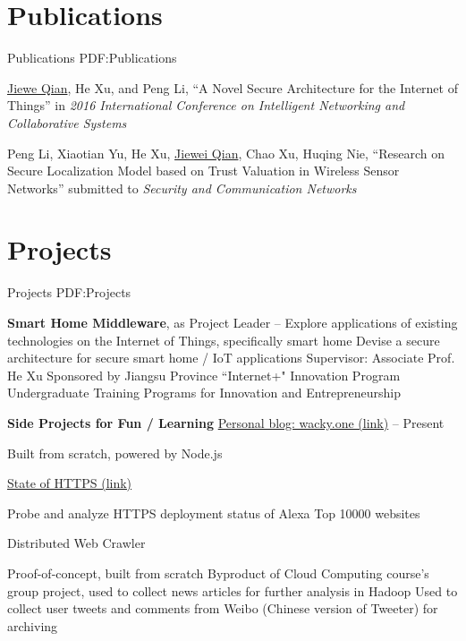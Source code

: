 \documentclass[a4paper,MMMyyyy,nonstop]{simpleresumecv}
\begin{document}
\begin{body}

\section
{Publications}
{Publications}
{PDF:Publications}

\BulletItem
\underline{Jiewe Qian}, He Xu, and Peng Li,
``A Novel Secure Architecture for the Internet of Things''
in \textit{2016 International Conference on Intelligent Networking and Collaborative Systems}

\GapNoBreak

\BulletItem
Peng Li, Xiaotian Yu, He Xu, \underline{Jiewei Qian}, Chao Xu, Huqing Nie,
``Research on Secure Localization Model based on Trust Valuation in Wireless Sensor Networks''
submitted to \textit{Security and Communication Networks}


\section
{Projects}
{Projects}
{PDF:Projects}

\textbf{Smart Home Middleware}, as Project Leader
\hfill {} -- 
\BulletItem
Explore applications of existing technologies on the Internet of Things, specifically smart home
\BulletItem
Devise a secure architecture for secure smart home / IoT applications
\BulletItem
Supervisor: Associate Prof. He Xu
\BulletItem
Sponsored by Jiangsu Province ``Internet+" Innovation Program
\BulletItem
Undergraduate Training Programs for Innovation and Entrepreneurship
\GapNoBreak

\textbf{Side Projects for Fun / Learning}
\BulletItem
\href{https://wacky.one/}{Personal blog: wacky.one (link)}
\hfill {} -- Present
\begin{detail}
\SubItem
Built from scratch, powered by Node.js
\end{detail}

\BulletItem
\href{https://wacky.one/blog/sad-state-of-https/}{State of HTTPS (link)}
\hfill {}
\begin{detail}
\SubItem
Probe and analyze HTTPS deployment status of Alexa Top 10000 websites
\end{detail}

\BulletItem
Distributed Web Crawler
\hfill {}
\begin{detail}
\SubItem
Proof-of-concept, built from scratch
\SubItem
Byproduct of Cloud Computing course's group project, used to collect news articles for further analysis in Hadoop
\SubItem
Used to collect user tweets and comments from Weibo (Chinese version of Tweeter) for archiving
\end{detail}


\end{body}
\end{document}
